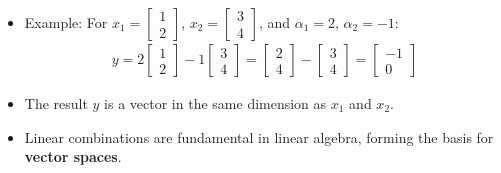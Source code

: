 \begin{frame}
    \begin{itemize}
        \item Example: For $x_1 = \begin{bmatrix} 1 \\ 2 \end{bmatrix}$, $x_2 = \begin{bmatrix} 3 \\ 4 \end{bmatrix}$, and $\alpha_1 = 2$, $\alpha_2 = -1$:
    \begin{align*}
        y = 2 \begin{bmatrix} 1 \\ 2 \end{bmatrix} - 1 \begin{bmatrix} 3 \\ 4 \end{bmatrix} = \begin{bmatrix} 2 \\ 4 \end{bmatrix} - \begin{bmatrix} 3 \\ 4 \end{bmatrix} = \begin{bmatrix} -1 \\ 0 \end{bmatrix}
    \end{align*}
        \item The result $y$ is a vector in the same dimension  as $x_1$ and $x_2$.
        \item Linear combinations are fundamental in linear algebra, forming the basis for \textbf{vector spaces}.
    \end{itemize}
\end{frame}



